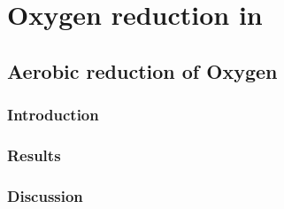 \chapter{Oxygen reduction in \Nm}
\section{Aerobic reduction of Oxygen}
\subsection{Introduction}
\subsection{Results}
\subsection{Discussion}